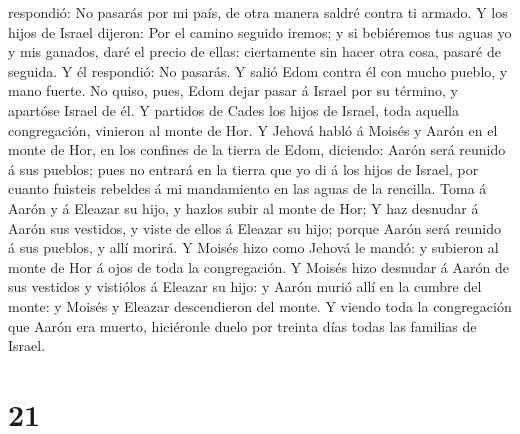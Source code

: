 respondió: No pasarás por mi país, de otra manera saldré contra ti
armado.  Y los hijos de Israel dijeron: Por el camino
seguido iremos; y si bebiéremos tus aguas yo y mis ganados, daré el
precio de ellas: ciertamente sin hacer otra cosa, pasaré de seguida.
 Y él respondió: No pasarás. Y salió Edom contra él con
mucho pueblo, y mano fuerte.  No quiso, pues, Edom dejar
pasar á Israel por su término, y apartóse Israel de él.  Y
partidos de Cades los hijos de Israel, toda aquella congregación,
vinieron al monte de Hor.  Y Jehová habló á Moisés y Aarón
en el monte de Hor, en los confines de la tierra de Edom, diciendo:
 Aarón será reunido á sus pueblos; pues no entrará en la
tierra que yo di á los hijos de Israel, por cuanto fuisteis rebeldes á
mi mandamiento en las aguas de la rencilla.  Toma á Aarón y
á Eleazar su hijo, y hazlos subir al monte de Hor;  Y haz
desnudar á Aarón sus vestidos, y viste de ellos á Eleazar su hijo;
porque Aarón será reunido á sus pueblos, y allí morirá.  Y
Moisés hizo como Jehová le mandó: y subieron al monte de Hor á ojos de
toda la congregación.  Y Moisés hizo desnudar á Aarón de
sus vestidos y vistiólos á Eleazar su hijo: y Aarón murió allí en la
cumbre del monte: y Moisés y Eleazar descendieron del monte.
 Y viendo toda la congregación que Aarón era muerto,
hiciéronle duelo por treinta días todas las familias de Israel.

\hypertarget{section-20}{%
\section{21}\label{section-20}}

